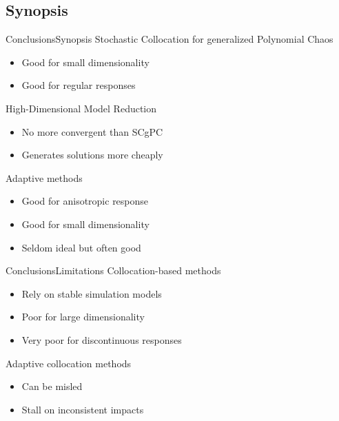 \documentclass{beamer}
\begin{document}
\subsection{Synopsis}
\begin{frame}{Conclusions}{Synopsis}%
  \vfill
  Stochastic Collocation for generalized Polynomial Chaos
  \begin{itemize}
    \item Good for small dimensionality
    \item Good for regular responses
  \end{itemize}
  \vfill
  High-Dimensional Model Reduction
  \begin{itemize}
    \item No more convergent than SCgPC
    \item Generates solutions more cheaply
  \end{itemize}
  \vfill
  Adaptive methods
  \begin{itemize}
    \item Good for anisotropic response
    \item Good for small dimensionality
    \item Seldom ideal but often good
  \end{itemize}
  \vfill
\end{frame}

\begin{frame}{Conclusions}{Limitations}\vspace{-20pt}
  \vfill
  Collocation-based methods
  \begin{itemize}
    \item Rely on stable simulation models
    \item Poor for large dimensionality
    \item Very poor for discontinuous responses
  \end{itemize}
  \vfill
  Adaptive collocation methods
  \begin{itemize}
    \item Can be misled
    \item Stall on inconsistent impacts
  \end{itemize}
  \vfill
\end{frame}
\end{document}
